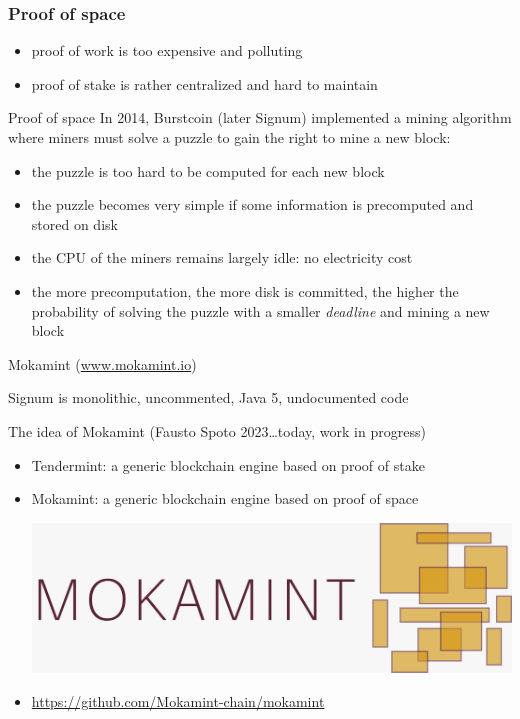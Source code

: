 \documentclass[11pt]{beamer}  %
\begin{document}
\begin{frame}\frametitle{Proof of space}

  \begin{itemize}
  \item proof of work is too expensive and polluting
  \item proof of stake is rather centralized and hard to maintain
  \end{itemize}

  \medskip

  \begin{greenbox}{Proof of space}
    In 2014, Burstcoin (later Signum) implemented a mining algorithm
    where miners must solve a puzzle to gain the right to mine a new block:
    \begin{itemize}
    \item the puzzle is too hard to be computed for each new block
    \item the puzzle becomes very simple if some information is precomputed and stored on disk
    \item the CPU of the miners remains largely idle: no electricity cost
    \item the more precomputation, the more disk is committed, the higher the probability of solving the puzzle with a smaller \emph{deadline} and mining a new block
    \end{itemize}
  \end{greenbox}
  
\end{frame}

\begin{frame}{Mokamint (\url{www.mokamint.io})}

  Signum is monolithic, uncommented, Java 5, undocumented code

  \bigskip
  \bigskip

  \begin{greenbox}{The idea of Mokamint (Fausto Spoto 2023\ldots today, work in progress)}
    \begin{itemize}
    \item Tendermint: a generic blockchain engine based on proof of stake
    \item Mokamint: a generic blockchain engine based on proof of space
      \begin{center}
        \includegraphics[scale=0.1,clip=false]{pictures/mokamint_colors.jpg}
      \end{center}
    \item \url{https://github.com/Mokamint-chain/mokamint}
    \end{itemize}
  \end{greenbox}

\end{frame}
\end{document}

